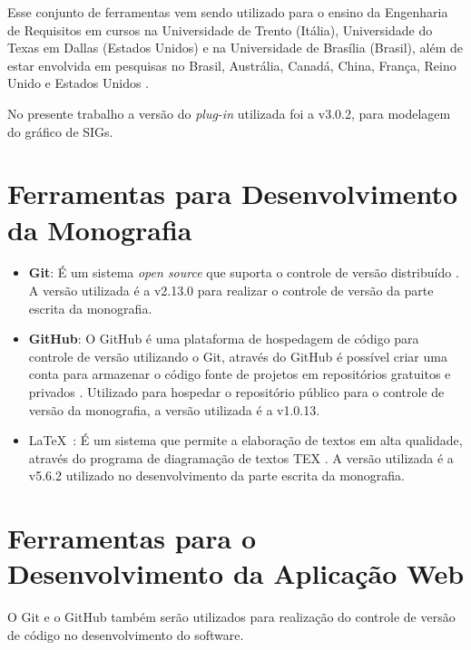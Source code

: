 \begin{itemize}
	Esse conjunto de ferramentas vem sendo utilizado para o ensino da Engenharia de Requisitos em cursos na Universidade de Trento (Itália), Universidade do Texas em Dallas (Estados Unidos) e na Universidade de Brasília (Brasil), além de estar envolvida em pesquisas no Brasil, Austrália, Canadá, China, França, Reino Unido e Estados Unidos \cite{supakkul2012re}. 
	
	No presente trabalho a versão do \textit{plug-in} utilizada foi a v3.0.2, para modelagem do gráfico de SIGs. 
\end{itemize}

\section{Ferramentas para Desenvolvimento da Monografia}
\label{sec:ferramentasDesenvolvimento}

\begin{itemize}
	
	\item \textbf{Git}: É um sistema \textit{open source} que suporta o controle de versão distribuído \cite{git}. A versão utilizada é a v2.13.0 para realizar o controle de versão da parte escrita da monografia. 
	
	\item \textbf{GitHub}: O GitHub é uma plataforma de hospedagem de código para controle de versão utilizando o Git, através do GitHub é possível criar uma conta para armazenar o código fonte de projetos em repositórios gratuitos e privados \cite{github}. Utilizado para hospedar o repositório público para o controle de versão da monografia, a versão utilizada é a v1.0.13.
	
	\item \LaTeX\ : É um sistema que permite a elaboração de textos em alta qualidade, através do programa de diagramação de textos TEX \cite{latex}. A versão utilizada é a v5.6.2 utilizado no desenvolvimento da parte escrita da monografia. 
	
\end{itemize}

\section{Ferramentas para o Desenvolvimento da Aplicação Web}
\label{sec:ferramentasParaDesenvolvimentoWebApp}

O Git e o GitHub também serão utilizados para realização do controle de versão de código no desenvolvimento do software.

